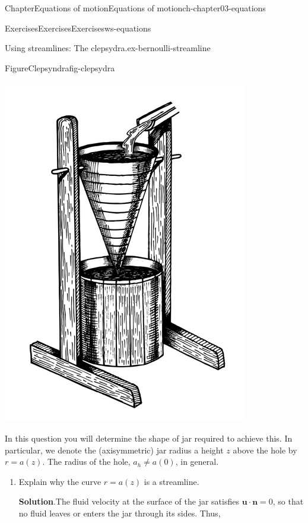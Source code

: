 \documentclass[oneside,10pt,]{book}
\newcommand{\blocktitlefont}{\relax}
\numberwithin{equation}{section}
\newcommand{\bn}{\boldsymbol{n}}
\newcommand{\bu}{\boldsymbol{u}}
\begin{document}
\begin{chapterptx}{Chapter}{Equations of motion}{}{Equations of motion}{}{}{ch-chapter03-equations}
\begin{exercises-section}{Exercises}{Exercises}{}{Exercises}{}{}{ws-equations}
\begin{divisionexercise}{8}{Using streamlines: The clepsydra.}{}{ex-bernoulli-streamline}
\begin{figureptx}{Figure}{Clepsyndra}{fig-clepsydra}{}
\begin{image}{0.25}{0.5}{0.25}{}
\includegraphics[width=\linewidth]{external/clepsydra.png}
\end{image}%
\tcblower
\end{figureptx}%
 In this question you will determine the shape of jar required to achieve this. In particular, we denote the (axisymmetric) jar radius a height \(z\) above the hole by \(r = a(z)\). The radius of the hole, \(a_h \ne a(0)\), in general.%
\begin{enumerate}[font=\bfseries,label=(\alph*),ref=\alph*]%
\item{}Explain why the curve \(r = a(z)\) is a streamline.%
\par\smallskip%
\noindent\textbf{\blocktitlefont Solution}.\hypertarget{ex-bernoulli-streamline-3-2}{}\quad{}The fluid velocity at the surface of the jar satisfies \(\bu\cdot\bn=0\), so that no fluid leaves or enters the jar through its sides. Thus,%
\begin{equation*}

\end{equation*}
\end{enumerate}
\end{divisionexercise}
\end{exercises-section}
\end{chapterptx}
\end{document}
